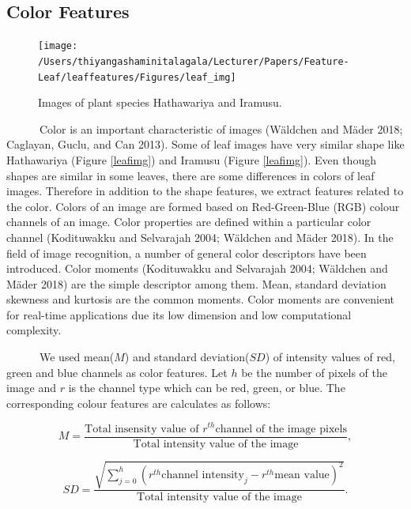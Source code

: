 \documentclass{article}
\begin{document}
\hypertarget{color-features}{%
\subsection{Color Features}\label{color-features}}

\begin{figure}[!ht]

{\centering \texttt{[image: /Users/thiyangashaminitalagala/Lecturer/Papers/Feature-Leaf/leaffeatures/Figures/leaf\_img]} 

}

\caption{\label{leafimg} Images of plant species Hathawariya and Iramusu.}\label{fig:unnamed-chunk-27}
\end{figure}

~~~~~~Color is an important characteristic of images (Wäldchen and Mäder
2018; Caglayan, Guclu, and Can 2013). Some of leaf images have very
similar shape like Hathawariya (Figure \ref{leafimg}) and Iramusu
(Figure \ref{leafimg}). Even though shapes are similar in some leaves,
there are some differences in colors of leaf images. Therefore in
addition to the shape features, we extract features related to the
color. Colors of an image are formed based on Red-Green-Blue (RGB)
colour channels of an image. Color properties are defined within a
particular color channel (Kodituwakku and Selvarajah 2004; Wäldchen and
Mäder 2018). In the field of image recognition, a number of general
color descriptors have been introduced. Color moments (Kodituwakku and
Selvarajah 2004; Wäldchen and Mäder 2018) are the simple descriptor
among them. Mean, standard deviation skewness and kurtosis are the
common moments. Color moments are convenient for real-time applications
due its low dimension and low computational complexity.

~~~~~~We used mean(\(M\)) and standard deviation(\(SD\)) of intensity
values of red, green and blue channels as color features. Let \(h\) be
the number of pixels of the image and \(r\) is the channel type which
can be red, green, or blue. The corresponding colour features are
calculates as follows:

\begin{equation}
    M = \frac{\text{Total insensity value of } r^{th} \text{channel of the image pixels}}{\text{Total intensity value of the image}},
\label{equa2}
\end{equation}

\begin{equation}
    SD = \frac{\sqrt{\sum_{j=0}^{h}(r^{th} \text{channel intensity}_j - r^{th} \text{mean value})^2}}{\text{Total intensity value of the image}}.
\label{equa3}
\end{equation}
\end{document}
